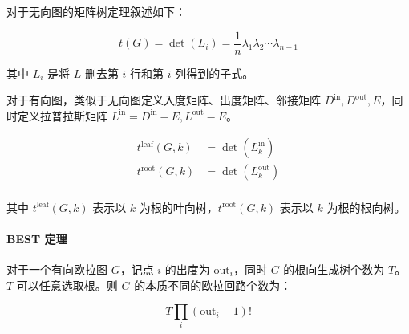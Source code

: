 \documentclass[10pt]{ctexart}
\begin{document}
\begin{multicols}{3}
    对于无向图的矩阵树定理叙述如下：

    \[t(G) = \det(L_i) = \frac{1}{n}\lambda_1\lambda_2\cdots \lambda_{n-1}\]

    其中 \(L_i\) 是将 \(L\) 删去第 \(i\) 行和第 \(i\) 列得到的子式。

    对于有向图，类似于无向图定义入度矩阵、出度矩阵、邻接矩阵
    \(D^{\mathrm{in}}, D^{\mathrm{out}}, E\)，同时定义拉普拉斯矩阵
    \(L^{\mathrm{in}} = D^{\mathrm{in}} - E,L^{\mathrm{out}} - E\)。

    \[\begin{aligned}
    t^{\mathrm{leaf}}(G, k) &= \det(L^{\mathrm{in}}_k) \\
    t^{\mathrm{root}}(G, k) &= \det(L^{\mathrm{out}}_k) \\
    \end{aligned}\]

    其中 \(t^{\mathrm{leaf}}(G, k)\) 表示以 \(k\)
    为根的叶向树，\(t^{\mathrm{root}}(G, k)\) 表示以 \(k\)
    为根的根向树。

    \paragraph{BEST 定理}\label{best-ux5b9aux7406}

    对于一个有向欧拉图 \(G\)，记点 \(i\) 的出度为
    \(\mathrm{out}_ i\)，同时 \(G\) 的根向生成树个数为 \(T\)。\(T\)
    可以任意选取根。则 \(G\) 的本质不同的欧拉回路个数为：

    \[T \prod_{i}(\mathrm{out}_i - 1)!\]


\end{multicols}
\end{document}
